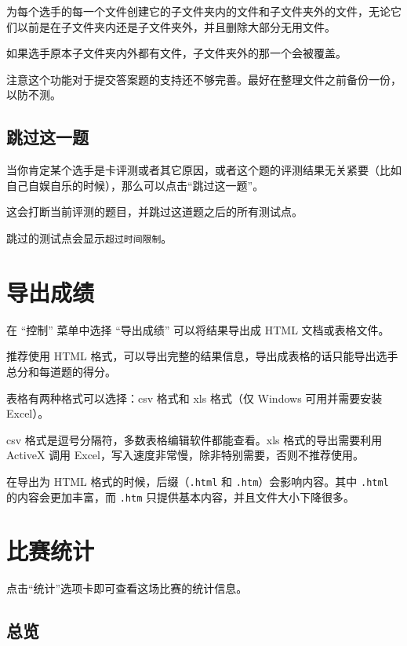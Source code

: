 \documentclass[UTF-8]{ctexart}
\begin{document}
			为每个选手的每一个文件创建它的子文件夹内的文件和子文件夹外的文件，无论它们以前是在子文件夹内还是子文件夹外，并且删除大部分无用文件。
			
			如果选手原本子文件夹内外都有文件，子文件夹外的那一个会被覆盖。
			
			注意这个功能对于提交答案题的支持还不够完善。最好在整理文件之前备份一份，以防不测。
		
		\subsection{跳过这一题}
		
			当你肯定某个选手是卡评测或者其它原因，或者这个题的评测结果无关紧要（比如自己自娱自乐的时候），那么可以点击“跳过这一题”。
			
			这会打断当前评测的题目，并跳过这道题之后的所有测试点。
			
			跳过的测试点会显示\texttt{超过时间限制}。
			
	\newpage
		
	\section{导出成绩}
	
		在 “控制” 菜单中选择 “导出成绩” 可以将结果导出成 HTML 文档或表格文件。
		
		推荐使用 HTML 格式，可以导出完整的结果信息，导出成表格的话只能导出选手总分和每道题的得分。
		
		表格有两种格式可以选择：csv 格式和 xls 格式（仅 Windows 可用并需要安装 Excel）。
		
		csv 格式是逗号分隔符，多数表格编辑软件都能查看。xls 格式的导出需要利用 ActiveX 调用 Excel，写入速度非常慢，除非特别需要，否则不推荐使用。
		
		在导出为 HTML 格式的时候，后缀（\texttt{.html} 和 \texttt{.htm}）会影响内容。其中 \texttt{.html} 的内容会更加丰富，而 \texttt{.htm} 只提供基本内容，并且文件大小下降很多。
		
	\newpage
	
	\section{比赛统计}
	
		点击“统计”选项卡即可查看这场比赛的统计信息。
		
		\subsection{总览}
		
\end{document}
